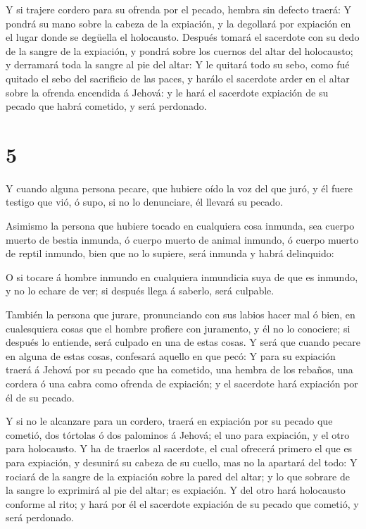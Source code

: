 Y si trajere cordero para su ofrenda por el pecado, hembra
sin defecto traerá:  Y pondrá su mano sobre la cabeza de la
expiación, y la degollará por expiación en el lugar donde se degüella el
holocausto.  Después tomará el sacerdote con su dedo de la
sangre de la expiación, y pondrá sobre los cuernos del altar del
holocausto; y derramará toda la sangre al pie del altar:  Y
le quitará todo su sebo, como fué quitado el sebo del sacrificio de las
paces, y harálo el sacerdote arder en el altar sobre la ofrenda
encendida á Jehová: y le hará el sacerdote expiación de su pecado que
habrá cometido, y será perdonado.

\hypertarget{section-4}{%
\section{5}\label{section-4}}

 Y cuando alguna persona pecare, que hubiere oído la voz del
que juró, y él fuere testigo que vió, ó supo, si no lo denunciare, él
llevará su pecado.

 Asimismo la persona que hubiere tocado en cualquiera cosa
inmunda, sea cuerpo muerto de bestia inmunda, ó cuerpo muerto de animal
inmundo, ó cuerpo muerto de reptil inmundo, bien que no lo supiere, será
inmunda y habrá delinquido:

 O si tocare á hombre inmundo en cualquiera inmundicia suya
de que es inmundo, y no lo echare de ver; si después llega á saberlo,
será culpable.

 También la persona que jurare, pronunciando con sus labios
hacer mal ó bien, en cualesquiera cosas que el hombre profiere con
juramento, y él no lo conociere; si después lo entiende, será culpado en
una de estas cosas.  Y será que cuando pecare en alguna de
estas cosas, confesará aquello en que pecó:  Y para su
expiación traerá á Jehová por su pecado que ha cometido, una hembra de
los rebaños, una cordera ó una cabra como ofrenda de expiación; y el
sacerdote hará expiación por él de su pecado.

 Y si no le alcanzare para un cordero, traerá en expiación
por su pecado que cometió, dos tórtolas ó dos palominos á Jehová; el uno
para expiación, y el otro para holocausto.  Y ha de traerlos
al sacerdote, el cual ofrecerá primero el que es para expiación, y
desunirá su cabeza de su cuello, mas no la apartará del todo:
 Y rociará de la sangre de la expiación sobre la pared del
altar; y lo que sobrare de la sangre lo exprimirá al pie del altar; es
expiación.  Y del otro hará holocausto conforme al rito; y
hará por él el sacerdote expiación de su pecado que cometió, y será
perdonado.

